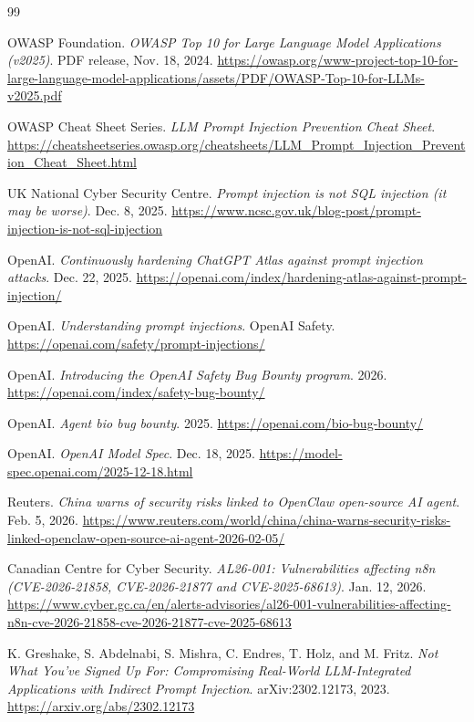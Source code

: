 \documentclass[11pt,a4paper]{report}
\begin{document}
\begin{thebibliography}{99}

OWASP Foundation.
\emph{OWASP Top 10 for Large Language Model Applications (v2025)}.
PDF release, Nov. 18, 2024.
\url{https://owasp.org/www-project-top-10-for-large-language-model-applications/assets/PDF/OWASP-Top-10-for-LLMs-v2025.pdf}

OWASP Cheat Sheet Series.
\emph{LLM Prompt Injection Prevention Cheat Sheet}.
\url{https://cheatsheetseries.owasp.org/cheatsheets/LLM_Prompt_Injection_Prevention_Cheat_Sheet.html}

UK National Cyber Security Centre.
\emph{Prompt injection is not SQL injection (it may be worse)}.
Dec. 8, 2025.
\url{https://www.ncsc.gov.uk/blog-post/prompt-injection-is-not-sql-injection}

OpenAI.
\emph{Continuously hardening ChatGPT Atlas against prompt injection attacks}.
Dec. 22, 2025.
\url{https://openai.com/index/hardening-atlas-against-prompt-injection/}

OpenAI.
\emph{Understanding prompt injections}.
OpenAI Safety.
\url{https://openai.com/safety/prompt-injections/}

OpenAI.
\emph{Introducing the OpenAI Safety Bug Bounty program}.
2026.
\url{https://openai.com/index/safety-bug-bounty/}

OpenAI.
\emph{Agent bio bug bounty}.
2025.
\url{https://openai.com/bio-bug-bounty/}

OpenAI.
\emph{OpenAI Model Spec}.
Dec. 18, 2025.
\url{https://model-spec.openai.com/2025-12-18.html}

Reuters.
\emph{China warns of security risks linked to OpenClaw open-source AI agent}.
Feb. 5, 2026.
\url{https://www.reuters.com/world/china/china-warns-security-risks-linked-openclaw-open-source-ai-agent-2026-02-05/}

Canadian Centre for Cyber Security.
\emph{AL26-001: Vulnerabilities affecting n8n (CVE-2026-21858, CVE-2026-21877 and CVE-2025-68613)}.
Jan. 12, 2026.
\url{https://www.cyber.gc.ca/en/alerts-advisories/al26-001-vulnerabilities-affecting-n8n-cve-2026-21858-cve-2026-21877-cve-2025-68613}

K. Greshake, S. Abdelnabi, S. Mishra, C. Endres, T. Holz, and M. Fritz.
\emph{Not What You've Signed Up For: Compromising Real-World LLM-Integrated Applications with Indirect Prompt Injection}.
arXiv:2302.12173, 2023.
\url{https://arxiv.org/abs/2302.12173}


\end{thebibliography}
\end{document}
